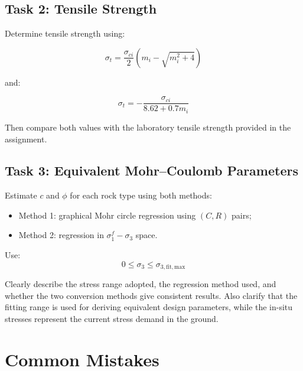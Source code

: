 \documentclass[a4paper,12pt]{article}
\begin{document}
\subsection{Task 2: Tensile Strength}

Determine tensile strength using:

\[
\sigma_t =
\frac{\sigma_{ci}}{2}
\left(
m_i - \sqrt{m_i^2+4}
\right)
\]

and:

\[
\sigma_t =
-\frac{\sigma_{ci}}{8.62+0.7m_i}
\]

Then compare both values with the laboratory tensile strength provided in the assignment.

\subsection{Task 3: Equivalent Mohr--Coulomb Parameters}

Estimate \(c\) and \(\phi\) for each rock type using both methods:

\begin{itemize}
    \item Method 1: graphical Mohr circle regression using \((C,R)\) pairs;
    \item Method 2: regression in \(\sigma_1^f-\sigma_3\) space.
\end{itemize}

Use:
\[
0 \leq \sigma_3 \leq \sigma_{3,\mathrm{fit,max}}
\]

\begin{notebox}
Clearly describe the stress range adopted, the regression method used, and whether the
two conversion methods give consistent results. Also clarify that the fitting range is used
for deriving equivalent design parameters, while the in-situ stresses represent the current
stress demand in the ground.
\end{notebox}

\section{Common Mistakes}
\end{document}
